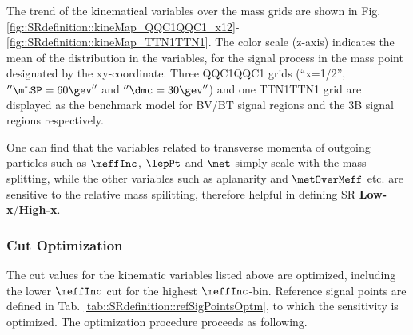 The trend of the kinematical variables over the mass grids are shown in Fig. \ref{fig::SRdefinition::kineMap_QQC1QQC1_x12}-\ref{fig::SRdefinition::kineMap_TTN1TTN1}. The color scale (z-axis) indicates the mean of the distribution in the variables, for the signal process in the mass point designated by the xy-coordinate. Three QQC1QQC1 grids (``x=1/2'', $''\mLSP=60\gev''$ and $''\dmc=30\gev''$) and one TTN1TTN1 grid are displayed as the benchmark model for BV/BT signal regions and the 3B signal regions respectively. 

One can find that the variables related to transverse momenta of outgoing particles such as $\meffInc$, $\lepPt$ and $\met$ simply scale with the mass splitting, while the other variables such as aplanarity and $\metOverMeff$ etc. are sensitive to the relative mass spilitting, therefore helpful in defining SR \textbf{Low-x}/\textbf{High-x}.
\clearpage
 


\clearpage		
\subsubsection{Cut Optimization}
The cut values for the kinematic variables listed above are optimized, including the lower $\meffInc$ cut for the highest $\meffInc$-bin. Reference signal points are defined in Tab. \ref{tab::SRdefinition::refSigPointsOptm}, to which the sensitivity is optimized. The optimization procedure proceeds as following.

